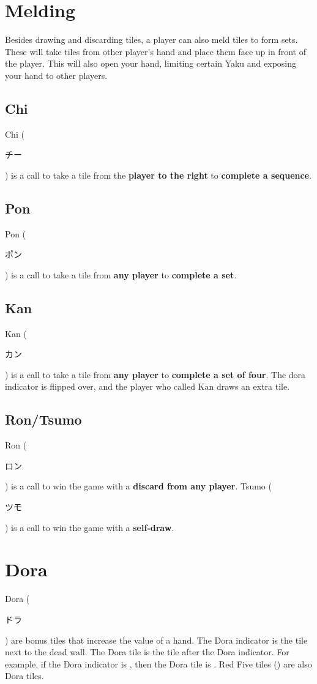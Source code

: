 \documentclass[8pt,landscape]{article}
\begin{document}
\begin{minipage}[t][.8\textheight][t]{\textwidth}
\begin{multicols*}{3}
    \section{Melding}
    Besides drawing and discarding tiles, a player can also meld tiles to form sets.
    These will take tiles from other player's hand and place them face up in front of the player.
    This will also open your hand, limiting certain Yaku and exposing your hand to other players.
    \subsection{Chi}
    Chi (\begin{CJK}{UTF8}{min}チー\end{CJK}) is a call to take a tile from the \textbf{player to the right} to \textbf{complete a sequence}.

    \subsection{Pon}
    Pon (\begin{CJK}{UTF8}{min}ポン\end{CJK}) is a call to take a tile from \textbf{any player} to \textbf{complete a set}.

    \subsection{Kan}
    Kan (\begin{CJK}{UTF8}{min}カン\end{CJK}) is a call to take a tile from \textbf{any player} to \textbf{complete a set of four}.
    The dora indicator is flipped over, and the player who called Kan draws an extra tile.

    \subsection{Ron/Tsumo}
    Ron (\begin{CJK}{UTF8}{min}ロン\end{CJK}) is a call to win the game with a \textbf{discard from any player}.
    Tsumo (\begin{CJK}{UTF8}{min}ツモ\end{CJK}) is a call to win the game with a \textbf{self-draw}.

    \section{Dora}
    Dora (\begin{CJK}{UTF8}{min}ドラ\end{CJK}) are bonus tiles that increase the value of a hand.
    The Dora indicator is the tile next to the dead wall.
    The Dora tile is the tile after the Dora indicator. For example, if the Dora indicator is , then the Dora tile is .
    Red Five tiles () are also Dora tiles.


\end{multicols*}
\end{minipage}
\end{document}

